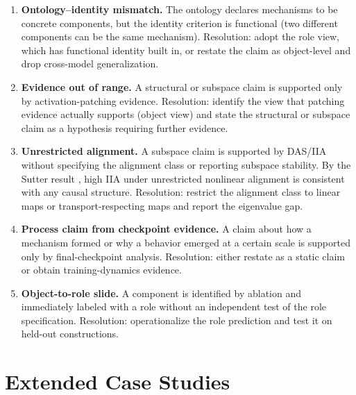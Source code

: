 \documentclass{article}
\begin{document}
\begin{enumerate}[leftmargin=*, label=(\arabic*)]

\item \textbf{Ontology--identity mismatch.}  The ontology declares
      mechanisms to be concrete components, but the identity criterion is
      functional (two different components can be the same mechanism).
      Resolution: adopt the role view, which has functional identity built
      in, or restate the claim as object-level and drop cross-model
      generalization.

\item \textbf{Evidence out of range.}  A structural or subspace claim
      is supported only by activation-patching evidence.  Resolution:
      identify the view that patching evidence actually supports (object
      view) and state the structural or subspace claim as a hypothesis
      requiring further evidence.

\item \textbf{Unrestricted alignment.}  A subspace claim is supported
      by DAS/IIA without specifying the alignment class or reporting
      subspace stability.  By the Sutter result \citep{sutter2025}, high
      IIA under unrestricted nonlinear alignment is consistent with any
      causal structure.  Resolution: restrict the alignment class to
      linear maps or transport-respecting maps and report the eigenvalue gap.

\item \textbf{Process claim from checkpoint evidence.}  A claim about
      how a mechanism formed or why a behavior emerged at a certain scale
      is supported only by final-checkpoint analysis.  Resolution: either
      restate as a static claim or obtain training-dynamics evidence.

\item \textbf{Object-to-role slide.}  A component is identified by
      ablation and immediately labeled with a role without an independent
      test of the role specification.  Resolution: operationalize the role
      prediction and test it on held-out constructions.

\end{enumerate}

\section{Extended Case Studies}\label{app:case_studies}
\end{document}
